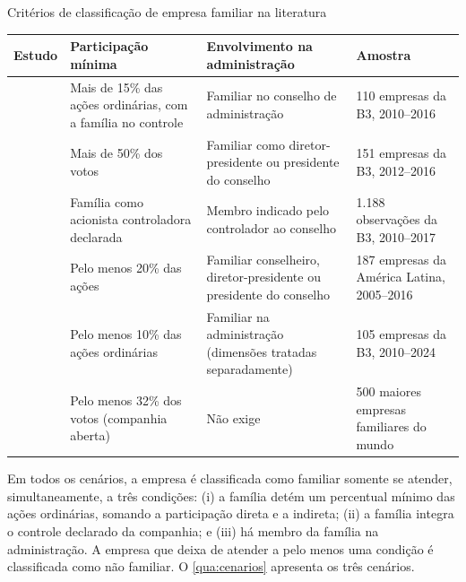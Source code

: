 \begin{quadro}[htb]
\caption{Critérios de classificação de empresa familiar na literatura}\label{qua:estudos}
\centering\small
\begin{tabularx}{\textwidth}{|P{3.4cm}|L|L|P{3.2cm}|}
\hline
\textbf{Estudo} & \textbf{Participação mínima} & \textbf{Envolvimento na administração} & \textbf{Amostra} \\ \hline
{} & Mais de 15\% das ações ordinárias, com a família no controle & Familiar no conselho de administração & 110 empresas da B3, 2010--2016 \\ \hline
{} & Mais de 50\% dos votos & Familiar como diretor-presidente ou presidente do conselho & 151 empresas da B3, 2012--2016 \\ \hline
{} & Família como acionista controladora declarada & Membro indicado pelo controlador ao conselho & 1.188 observações da B3, 2010--2017 \\ \hline
{} & Pelo menos 20\% das ações & Familiar conselheiro, diretor-presidente ou presidente do conselho & 187 empresas da América Latina, 2005--2016 \\ \hline
{} & Pelo menos 10\% das ações ordinárias & Familiar na administração (dimensões tratadas separadamente) & 105 empresas da B3, 2010--2024 \\ \hline
{} & Pelo menos 32\% dos votos (companhia aberta) & Não exige & 500 maiores empresas familiares do mundo \\ \hline
\end{tabularx}
\end{quadro}

Em todos os cenários, a empresa é classificada como familiar somente se atender,
simultaneamente, a três condições: (i) a família detém um percentual mínimo das
ações ordinárias, somando a participação direta e a indireta; (ii) a família
integra o controle declarado da companhia; e (iii) há membro da família na
administração. A empresa que deixa de atender a pelo menos uma condição é
classificada como não familiar. O \autoref{qua:cenarios} apresenta os três
cenários.


